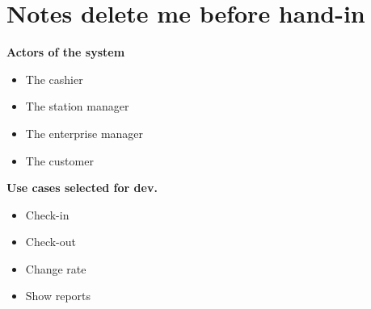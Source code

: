 \section{Notes delete me before hand-in}

\textbf{Actors of the system}
\begin{itemize}
    \item The cashier
    \item The station manager
    \item The enterprise manager
    \item The customer
\end{itemize}

\textbf{Use cases selected for dev.}
\begin{itemize}
    \item Check-in
    \item Check-out
    \item Change rate
    \item Show reports
\end{itemize}